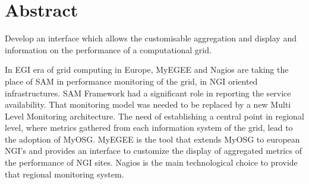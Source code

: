 \section*{Abstract}
Develop an interface which allows the customisable aggregation and display and information on the performance of a computational grid.

In EGI era of grid computing in Europe, MyEGEE and Nagios are taking the place of SAM in performance monitoring of the grid, in NGI oriented infrastructures. SAM Framework had a significant role in reporting the service availability. That monitoring model was needed to be replaced by a new Multi Level Monitoring architecture. The need of establishing a central point in regional level, where metrics gathered from each information system of the grid, lead to the adoption of MyOSG. MyEGEE is the tool that extends MyOSG to european NGI's and provides an interface to customize the display of aggregated metrics of the performance of NGI sites. Nagios is the main technological choice to provide that regional monitoring system.
\clearpage
